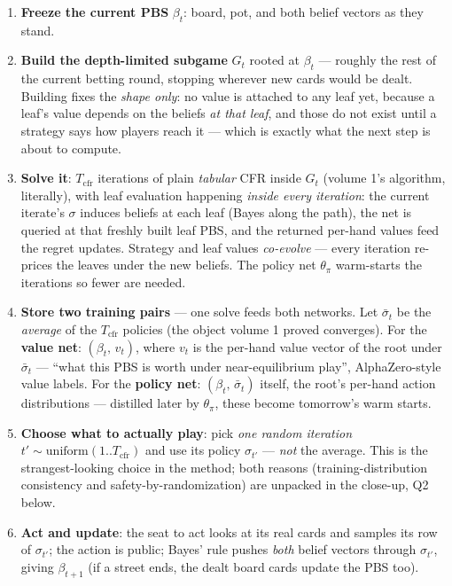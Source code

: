 \documentclass[11pt,a4paper]{article}
\begin{document}
\begin{enumerate}[leftmargin=1.6em, itemsep=1pt]
\item \textbf{Freeze the current PBS} $\beta_t$: board, pot, and both belief
  vectors as they stand.
\item \textbf{Build the depth-limited subgame} $G_t$ rooted at $\beta_t$ ---
  roughly the rest of the current betting round, stopping wherever new cards
  would be dealt. Building fixes the \emph{shape only}: no value is attached
  to any leaf yet, because a leaf's value depends on the beliefs \emph{at
  that leaf}, and those do not exist until a strategy says how players reach
  it --- which is exactly what the next step is about to compute.
\item \textbf{Solve it}: $T_{\mathrm{cfr}}$ iterations of plain
  \emph{tabular} CFR inside $G_t$ (volume 1's algorithm, literally), with
  leaf evaluation happening \emph{inside every iteration}: the current
  iterate's $\sigma$ induces beliefs at each leaf (Bayes along the path),
  the net is queried at that freshly built leaf PBS, and the returned
  per-hand values feed the regret updates. Strategy and leaf values
  \emph{co-evolve} --- every iteration re-prices the leaves under the new
  beliefs. The policy net $\theta_\pi$ warm-starts the iterations so fewer
  are needed.
\item \textbf{Store two training pairs} --- one solve feeds both networks.
  Let $\bar\sigma_t$ be the \emph{average} of the $T_{\mathrm{cfr}}$
  policies (the object volume 1 proved converges). For the \textbf{value
  net}: $(\beta_t,\, v_t)$, where $v_t$ is the per-hand value vector of the
  root under $\bar\sigma_t$ --- ``what this PBS is worth under
  near-equilibrium play'', AlphaZero-style value labels. For the
  \textbf{policy net}: $(\beta_t,\, \bar\sigma_t)$ itself, the root's
  per-hand action distributions --- distilled later by $\theta_\pi$, these
  become tomorrow's warm starts.
\item \textbf{Choose what to actually play}: pick \emph{one random
  iteration} $t' \sim \mathrm{uniform}(1..T_{\mathrm{cfr}})$ and use its
  policy $\sigma_{t'}$ --- \emph{not} the average. This is the
  strangest-looking choice in the method; both reasons (training-distribution
  consistency and safety-by-randomization) are unpacked in the close-up,
  Q2 below.
\item \textbf{Act and update}: the seat to act looks at its real cards and
  samples its row of $\sigma_{t'}$; the action is public; Bayes' rule pushes
  \emph{both} belief vectors through $\sigma_{t'}$, giving $\beta_{t+1}$
  (if a street ends, the dealt board cards update the PBS too).
\end{enumerate}
\end{document}
